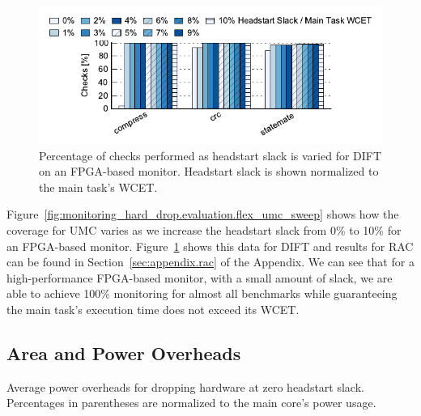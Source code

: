 \begin{figure}
  \begin{center}
    \includegraphics{monitoring_hard_drop/data/flex_dift_sweep.pdf}
    \caption{Percentage of checks performed as headstart slack is varied for
    DIFT on an FPGA-based monitor. Headstart slack is shown normalized to the
    main task's WCET.}
    \label{fig:monitoring_hard_drop.evaluation.flex_dift_sweep}
  \end{center}
\end{figure}

Figure~\ref{fig:monitoring_hard_drop.evaluation.flex_umc_sweep} shows how the
coverage for UMC varies as we increase the headstart slack from 0\% to 10\% for
an FPGA-based monitor.
Figure~\ref{fig:monitoring_hard_drop.evaluation.flex_dift_sweep} shows this
data for DIFT and results for RAC can be found in
Section~\ref{sec:appendix.rac} of the Appendix.  We can see that for a
high-performance FPGA-based monitor, with a small amount of slack, we are able
to achieve 100\% monitoring for almost all benchmarks while guaranteeing the
main task's execution time does not exceed its WCET. 

\subsection{Area and Power Overheads}

\begin{table}[tb]
  \begin{center}
    \caption{Average power overheads for dropping hardware at zero headstart
    slack. Percentages in parentheses are normalized to the main core's power usage.}
    \begin{footnotesize}
    
    \end{footnotesize}
    \label{tab:monitoring_hard_drop.evaluation.area_power}
  \end{center}
\end{table}

